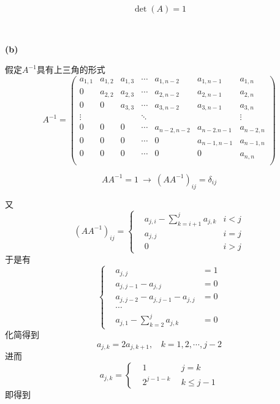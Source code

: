 \documentclass[UTF8]{ctexart}
\begin{document}
\begin{equation}\label{2-a-1}
    \det(A)=1
\end{equation}

~\

\noindent\textbf{(b)}

假定$A^{-1}$具有上三角的形式
$$
A^{-1}=
\left(
    \begin{array}{ccccccc}
        a_{1,1} & a_{1,2} & a_{1,3} & \cdots & a_{1,n-2} & a_{1,n-1} & a_{1,n}\\
        0 & a_{2,2} & a_{2,3} & \cdots & a_{2,n-2} & a_{2,n-1} & a_{2,n}\\
        0 & 0 & a_{3,3} & \cdots & a_{3,n-2} & a_{3,n-1} & a_{3,n}\\
        \vdots & & & \ddots & & & \vdots \\
        0 & 0 & 0 & \cdots & a_{n-2,n-2}  & a_{n-2.n-1} & a_{n-2,n}\\
        0 & 0 & 0 & \cdots & 0  & a_{n-1,n-1} & a_{n-1,n}\\
        0 & 0 & 0 & \cdots & 0  & 0 & a_{n,n}\\
    \end{array}
\right)
$$

\begin{equation}\label{2-b-1}
AA^{-1}=1\ \rightarrow\ (AA^{-1})_{ij}=\delta_{ij}
\end{equation}

又
\begin{equation}\label{2-b-2}
(AA^{-1})_{ij}=
\left\{
\begin{aligned}
    &a_{j,i}-\sum_{k=i+1}^j a_{j,k} & i<j\\
    &a_{j,j} & i=j\\
    &0 & i>j
\end{aligned}
\right.
\end{equation}
于是有
\begin{equation}\label{2-b-3}
\left\{
\begin{aligned}
    &a_{j,j}&=1\\
    &a_{j,j-1}-a_{j,j}&=0\\
    &a_{j,j-2}-a_{j,j-1}-a_{j,j}&=0\\
    &\cdots\\
    &a_{j,1}-\sum_{k=2}^j a_{j,k}&=0
\end{aligned}
\right.
\end{equation}
化简得到
\begin{equation}\label{2-b-4}
a_{j,k}=2a_{j,k+1},\ \ \ \ k=1,2,\cdots,j-2
\end{equation}
进而
\begin{equation}\label{2-b-5}
a_{j,k}=
\left\{
    \begin{aligned}
        &1 &\ \ j=k\\
        &2^{j-1-k}&\ \ k\leq j-1
    \end{aligned}
\right.
\end{equation}
即得到
\end{document}

